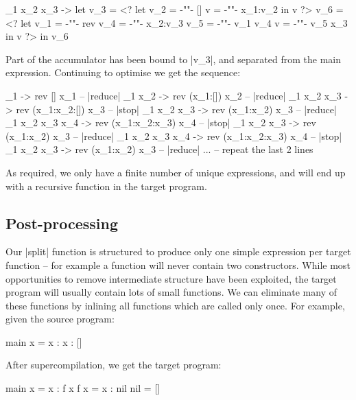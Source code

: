 \documentclass[draft]{sigplanconf}
\begin{document}
\begin{code}
\x_1 x_2 x_3 ->
    let  v_3 =  <?  let  v_2  = {-""-}  []
                         v    = {-""-}   x_1:v_2
                    in   v ?>
         v_6 =  <?  let  v_1  = {-""-}   rev
                         v_4  = {-""-}   x_2:v_3
                         v_5  = {-""-}   v_1 v_4
                         v    = {-""-}   v_5 x_3
                    in   v ?>
    in   v_6
\end{code}

Part of the accumulator has been bound to |v_3|, and separated from the main expression. Continuing to optimise we get the sequence:

\begin{code}
\x_1 -> rev [] x_1                          -- |reduce|
\x_1 x_2 -> rev (x_1:[]) x_2                -- |reduce|
\x_1 x_2 x_3 -> rev (x_1:x_2:[]) x_3        -- |stop|
\x_1 x_2 x_3 -> rev (x_1:x_2) x_3           -- |reduce|
\x_1 x_2 x_3 x_4 -> rev (x_1:x_2:x_3) x_4   -- |stop|
\x_1 x_2 x_3 -> rev (x_1:x_2) x_3           -- |reduce|
\x_1 x_2 x_3 x_4 -> rev (x_1:x_2:x_3) x_4   -- |stop|
\x_1 x_2 x_3 -> rev (x_1:x_2) x_3           -- |reduce|
... -- repeat the last 2 lines
\end{code}

As required, we only have a finite number of unique expressions, and will end up with a recursive function in the target program.

\subsection{Post-processing}
\label{sec:postprocess}

Our |split| function is structured to produce only one simple expression per target function -- for example a function will never contain two constructors. While most opportunities to remove intermediate structure have been exploited, the target program will usually contain lots of small functions. We can eliminate many of these functions by inlining all functions which are called only once. For example, given the source program:

\begin{code}
main x = x : x : []
\end{code}

After supercompilation, we get the target program:

\begin{code}
main x = x : f x
f x = x : nil
nil = []
\end{code}
\end{document}
